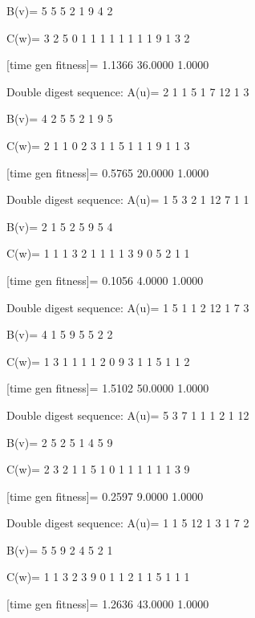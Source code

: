B(v)=
     5     5     5     2     1     9     4     2

C(w)=
     3     2     5     0     1     1     1     1     1     1     1     1     9     1     3     2

[time gen fitness]=
    1.1366   36.0000    1.0000

Double digest sequence:
A(u)=
     2     1     1     5     1     7    12     1     3

B(v)=
     4     2     5     5     2     1     9     5

C(w)=
     2     1     1     0     2     3     1     1     5     1     1     1     9     1     1     3

[time gen fitness]=
    0.5765   20.0000    1.0000

Double digest sequence:
A(u)=
     1     5     3     2     1    12     7     1     1

B(v)=
     2     1     5     2     5     9     5     4

C(w)=
     1     1     1     3     2     1     1     1     1     3     9     0     5     2     1     1

[time gen fitness]=
    0.1056    4.0000    1.0000

Double digest sequence:
A(u)=
     1     5     1     1     2    12     1     7     3

B(v)=
     4     1     5     9     5     5     2     2

C(w)=
     1     3     1     1     1     1     2     0     9     3     1     1     5     1     1     2

[time gen fitness]=
    1.5102   50.0000    1.0000

Double digest sequence:
A(u)=
     5     3     7     1     1     1     2     1    12

B(v)=
     2     5     2     5     1     4     5     9

C(w)=
     2     3     2     1     1     5     1     0     1     1     1     1     1     1     3     9

[time gen fitness]=
    0.2597    9.0000    1.0000

Double digest sequence:
A(u)=
     1     1     5    12     1     3     1     7     2

B(v)=
     5     5     9     2     4     5     2     1

C(w)=
     1     1     3     2     3     9     0     1     1     2     1     1     5     1     1     1

[time gen fitness]=
    1.2636   43.0000    1.0000


